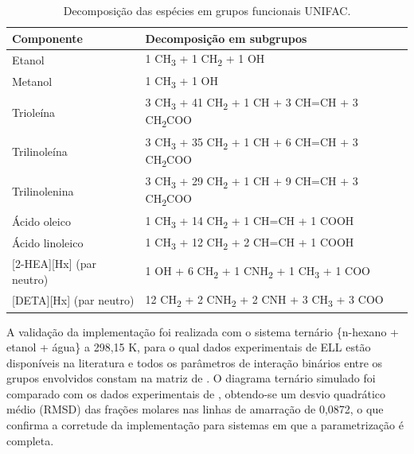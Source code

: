 \begin{table}[H]
\caption{Decomposição das espécies em grupos funcionais UNIFAC.}
\label{tab:decomposicao_unifac}
\centering
\begin{tabularx}{\textwidth}{lX}
\toprule
\textbf{Componente} & \textbf{Decomposição em subgrupos} \\
\midrule
Etanol & 1 CH\textsubscript{3} + 1 CH\textsubscript{2} + 1 OH \\
Metanol & 1 CH\textsubscript{3} + 1 OH \\
Trioleína & 3 CH\textsubscript{3} + 41 CH\textsubscript{2} + 1 CH + 3 CH=CH + 3 CH\textsubscript{2}COO \\
Trilinoleína & 3 CH\textsubscript{3} + 35 CH\textsubscript{2} + 1 CH + 6 CH=CH + 3 CH\textsubscript{2}COO \\
Trilinolenina & 3 CH\textsubscript{3} + 29 CH\textsubscript{2} + 1 CH + 9 CH=CH + 3 CH\textsubscript{2}COO \\
Ácido oleico & 1 CH\textsubscript{3} + 14 CH\textsubscript{2} + 1 CH=CH + 1 COOH \\
Ácido linoleico & 1 CH\textsubscript{3} + 12 CH\textsubscript{2} + 2 CH=CH + 1 COOH \\
{[2-HEA][Hx]} (par neutro) & 1 OH + 6 CH\textsubscript{2} + 1 CNH\textsubscript{2} + 1 CH\textsubscript{3} + 1 COO \\
{[DETA][Hx]} (par neutro) & 12 CH\textsubscript{2} + 2 CNH\textsubscript{2} + 2 CNH + 3 CH\textsubscript{3} + 3 COO \\
\bottomrule
\end{tabularx}
\end{table}

A validação da implementação foi realizada com o sistema ternário \{n-hexano + etanol + água\} a 298,15 K, para o qual dados experimentais de ELL estão disponíveis na literatura e todos os parâmetros de interação binários entre os grupos envolvidos constam na matriz de . O diagrama ternário simulado foi comparado com os dados experimentais de , obtendo-se um desvio quadrático médio (RMSD) das frações molares nas linhas de amarração de 0,0872, o que confirma a corretude da implementação para sistemas em que a parametrização é completa.


